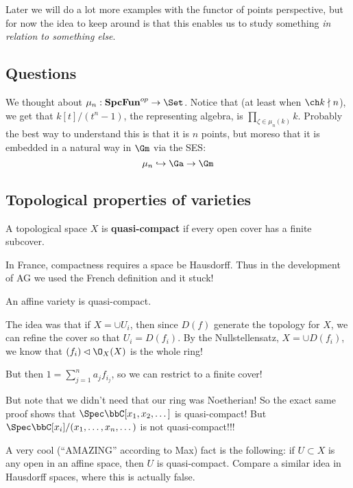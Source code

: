\documentclass[12pt]{article}
\newcommand{\SpcFun}{\mathbf{SpcFun}}
\begin{document}
Later we will do a lot more examples with the functor of points perspective, but for now the idea to keep around 
is that this enables us to study something \textit{in relation to something else}.

\subsection{Questions}
We thought about $\mu_n:\SpcFun^{op}\to\Set$. Notice that (at least when $\ch k\nmid n$), we get that 
$k[t]/(t^n-1)$, the representing algebra, is $\prod_{\zeta\in\mu_n(k)}k$. Probably the best way to understand 
this is that it is $n$ points, but moreso that it is embedded in a natural way in $\Gm$ via the SES:
\[\mu_n\hookrightarrow\Ga\to\Gm\]

\subsection{Topological properties of varieties}
\begin{defn}
	A topological space $X$ is \textbf{quasi-compact} if every open cover has a finite subcover.
\end{defn}
\begin{rmk}
	In France, compactness requires a space be Hausdorff. Thus in the development of AG we used the French 
	definition and it stuck!
\end{rmk}
\begin{lem}
	An affine variety is quasi-compact.
\end{lem}
\begin{prf}
	The idea was that if $X=\cup U_i$, then since $D(f)$ generate the topology for $X$, we can refine
	the cover so that $U_i=D(f_i)$. By the Nullstellensatz, $X=\cup D(f_i)$, we know that $(f_i)\lhd \O_X(X)$
	is the whole ring!

	But then $1=\sum_{j=1}^n a_jf_{i_j}$, so we can restrict to a finite cover!
\end{prf}
But note that we didn't need that our ring was Noetherian! So the exact same proof shows that $\Spec \bbC[x_1,x_2,\dots]$ is 
quasi-compact! But $\Spec \bbC[x_i]/(x_1,\dots,x_n,\dots)$ is not quasi-compact!!!

\begin{rmk}
	A very cool (``AMAZING'' according to Max) fact is the following: if $U\subset X$ is any open in an affine space, then $U$ is quasi-compact.
	Compare a similar idea in Hausdorff spaces, where this is actually false.
\end{rmk}
\end{document}
